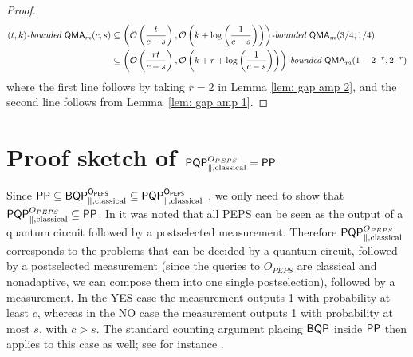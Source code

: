 \documentclass[11pt]{article}
\theoremstyle{definition}
\theoremstyle{remark}
\newcommand\QMA{{\sf{QMA}}}
\newcommand\PP{\sf{PP}}
\newcommand\BQP{{\sf{BQP}}}
\newcommand\PQP{{\sf{PQP}}}
\newcommand\bddQMA[5]{{\left(#1,#2\right)}\textit{-bounded }\QMA_{#3}(#4,#5)}
\begin{document}
\begin{proof}
\begin{align}
\bddQMA{t}{k}{m}{c}{s} &\subseteq \bddQMA{\mathcal{O}\left(\frac{t}{c-s}\right)}{\mathcal{O}\left(k+\log\left(\frac{1}{c-s}\right)\right)}{m}{3/4}{1/4}  \nonumber \\
&\subseteq \bddQMA{\mathcal{O}\left(\frac{rt}{c-s}\right)}{\mathcal{O}\left(k+r+\log\left(\frac{1}{c-s}\right)\right)}{m}{1-2^{-r}}{2^{-r}} \nonumber
\end{align}
where the first line follows by taking $r=2$ in Lemma \ref{lem: gap amp 2}, and the second line follows from Lemma~\ref{lem: gap amp 1}.
\end{proof}

\section{Proof sketch of $\PQP^{O_{PEPS}}_{\parallel,\text{classical}} = \PP$} \label{app:peps}
Since $\PP \subseteq \BQP^{O_{PEPS}}_{\parallel,\text{classical}} \subseteq \PQP^{O_{PEPS}}_{\parallel,\text{classical}}$ \cite{swv07}, we only need to show that $\PQP^{O_{PEPS}}_{\parallel,\text{classical}} \subseteq \PP$. In \cite{swv07} it was noted that all PEPS can be seen as the output of a quantum circuit followed by a postselected measurement. Therefore $\PQP^{O_{PEPS}}_{\parallel,\text{classical}}$ corresponds to the problems that can be decided by a quantum circuit, followed by a postselected measurement (since the queries to $O_{PEPS}$ are classical and nonadaptive, we can compose them into one single postselection), followed by a measurement. In the YES case the measurement outputs 1 with probability at least $c$, whereas in the NO case the measurement outputs 1 with probability at most $s$, with $c > s$. The standard counting argument placing $\BQP$ inside $\PP$ then applies to this case as well; see for instance \cite[Propositions~2~and~3]{aaronson05}.
\end{document}
